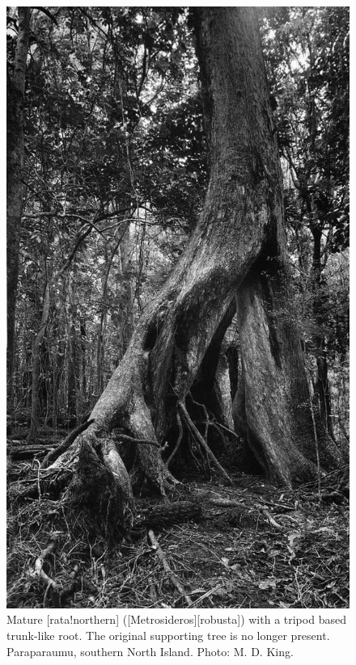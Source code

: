 \begin{figure}[!b]
\begin{minipage}[t]{\textwidth}
		\begin{minipage}[t]{(\textwidth-\fgap) * \real{0.46}}
			\centering
			\includegraphics[width=\textwidth]{graphics/figure51rata.jpg}
			\caption[Mature northern rata with a tripod based trunk-like root]{Mature [rata!northern] ([Metrosideros][robusta]) with a tripod based trunk-like root.
			The original supporting tree is no longer present.
			Paraparaumu, southern North Island.
			Photo: M. D. King.}%
			\label{fig:51rata}
		\end{minipage}
	\end{minipage}
\end{figure}

